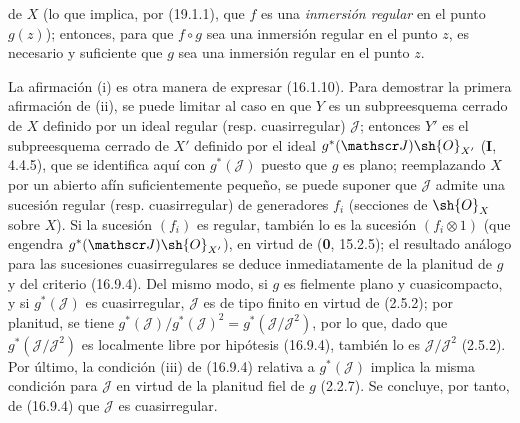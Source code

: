 \begin{proposition}[19.1.5]
\begin{enumerate}
de $X$ \textup{(lo que implica, por (19.1.1), que $f$ es una \emph{inmersión regular} en el punto $g(z)$)}; entonces, 
para que $f\circ g$ sea una inmersión regular en el punto $z$, es necesario y suficiente que $g$ sea una inmersión regular en el punto $z$.
\end{enumerate}
\end{proposition}

La afirmación (i) es otra manera de expresar (16.1.10). Para demostrar la primera afirmación de (ii), se puede limitar al caso en que $Y$ es un subpreesquema cerrado de $X$ definido por un ideal regular (resp. cuasirregular) $\mathscr J$; entonces $Y'$ es el subpreesquema cerrado de $X'$ definido por el ideal $g^*(\mathscr J)\sh{O}_{X'}$ (\textbf I, 4.4.5), que se identifica aquí con $g^*(\mathscr J)$ puesto que $g$ es plano; reemplazando $X$ por un abierto afín suficientemente pequeño, se puede suponer que $\mathscr J$ admite una sucesión regular (resp. cuasirregular) de generadores $f_i$ (secciones de $\sh{O}_X$ sobre $X$). Si la sucesión $(f_i)$ es regular, también lo es la sucesión $(f_i\otimes1)$ (que engendra $g^*(\mathscr J)\sh{O}_{X'}$), en virtud de (\textbf{0}, 15.2.5); el resultado análogo para las sucesiones cuasirregulares se deduce inmediatamente de la planitud de $g$ y del criterio (16.9.4). Del mismo modo, si $g$ es fielmente plano y cuasicompacto, y si $g^*(\mathscr J)$ es cuasirregular, $\mathscr J$ es de tipo finito en virtud de (2.5.2); por planitud, se tiene $g^*(\mathscr J)/g^*(\mathscr J)^2=g^*(\mathscr J/\mathscr J^2)$, por lo que, dado que $g^*(\mathscr J/\mathscr J^2)$ es localmente libre por hipótesis (16.9.4), también lo es $\mathscr J/\mathscr J^2$ (2.5.2). Por último, la condición (iii) de (16.9.4) relativa a $g^*(\mathscr J)$ implica la misma condición para $\mathscr J$ en virtud de la planitud fiel de $g$ (2.2.7). Se concluye, por tanto, de (16.9.4) que $\mathscr J$ es cuasirregular.

